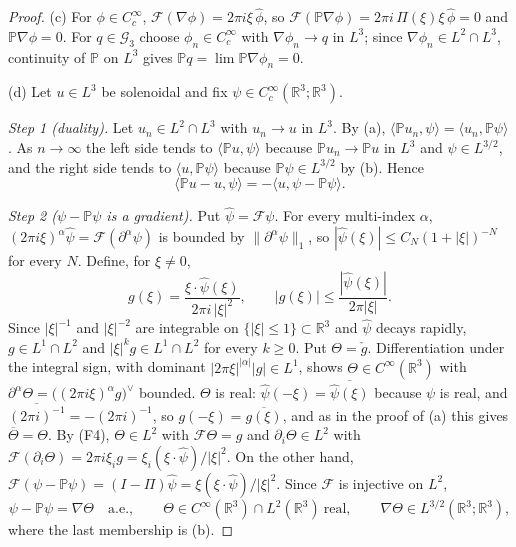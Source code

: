 \documentclass[11pt]{article}
\theoremstyle{definition}
\theoremstyle{plain}
\newcommand{\R}{\mathbb R}
\newcommand{\norm}[1]{\lVert #1\rVert}
\begin{document}
\begin{proof}
(c) For $\phi\in C_c^\infty$, $\mathcal F(\nabla\phi)=2\pi i\xi\,\hat\phi$,
so $\mathcal F(\mathbb P\nabla\phi)=2\pi i\,\Pi(\xi)\xi\,\hat\phi=0$ and
$\mathbb P\nabla\phi=0$.  For $q\in\mathcal G_3$ choose
$\phi_n\in C_c^\infty$ with $\nabla\phi_n\to q$ in $L^3$; since
$\nabla\phi_n\in L^2\cap L^3$, continuity of $\mathbb P$ on $L^3$ gives
$\mathbb Pq=\lim\mathbb P\nabla\phi_n=0$.

(d) Let $u\in L^3$ be solenoidal and fix $\psi\in C_c^\infty(\R^3;\R^3)$.

\emph{Step 1 (duality).}  Let $u_n\in L^2\cap L^3$ with $u_n\to u$ in
$L^3$.  By (a), $\langle\mathbb Pu_n,\psi\rangle=\langle u_n,\mathbb P\psi\rangle$.
As $n\to\infty$ the left side tends to $\langle\mathbb Pu,\psi\rangle$
because $\mathbb Pu_n\to\mathbb Pu$ in $L^3$ and $\psi\in L^{3/2}$, and
the right side tends to $\langle u,\mathbb P\psi\rangle$ because
$\mathbb P\psi\in L^{3/2}$ by (b).  Hence
\begin{equation}\label{eq:cp-duality}
 \langle\mathbb Pu-u,\psi\rangle=-\langle u,\psi-\mathbb P\psi\rangle .
\end{equation}

\emph{Step 2 ($\psi-\mathbb P\psi$ is a gradient).}  Put
$\hat\psi=\mathcal F\psi$.  For every multi-index $\alpha$,
$(2\pi i\xi)^\alpha\hat\psi=\mathcal F(\partial^\alpha\psi)$ is bounded by
$\norm{\partial^\alpha\psi}_1$, so $|\hat\psi(\xi)|\le C_N(1+|\xi|)^{-N}$
for every $N$.  Define, for $\xi\ne0$,
\[
 g(\xi)=\frac{\xi\cdot\hat\psi(\xi)}{2\pi i\,|\xi|^2},
 \qquad |g(\xi)|\le\frac{|\hat\psi(\xi)|}{2\pi|\xi|} .
\]
Since $|\xi|^{-1}$ and $|\xi|^{-2}$ are integrable on $\{|\xi|\le1\}\subset\R^3$
and $\hat\psi$ decays rapidly, $g\in L^1\cap L^2$ and
$|\xi|^kg\in L^1\cap L^2$ for every $k\ge0$.  Put $\Theta=\check g$.
Differentiation under the integral sign, with dominant
$|2\pi\xi|^{|\alpha|}|g|\in L^1$, shows $\Theta\in C^\infty(\R^3)$ with
$\partial^\alpha\Theta=\bigl((2\pi i\xi)^\alpha g\bigr)^\vee$ bounded.
$\Theta$ is real: $\hat\psi(-\xi)=\overline{\hat\psi(\xi)}$ because $\psi$
is real, and $\overline{(2\pi i)^{-1}}=-(2\pi i)^{-1}$, so
$g(-\xi)=\overline{g(\xi)}$, and as in the proof of (a) this gives
$\overline{\Theta}=\Theta$.  By (F4), $\Theta\in L^2$ with $\mathcal F\Theta=g$
and $\partial_i\Theta\in L^2$ with
$\mathcal F(\partial_i\Theta)=2\pi i\xi_ig=\xi_i(\xi\cdot\hat\psi)/|\xi|^2$.
On the other hand,
$\mathcal F(\psi-\mathbb P\psi)=(I-\Pi)\hat\psi=\xi(\xi\cdot\hat\psi)/|\xi|^2$.
Since $\mathcal F$ is injective on $L^2$,
\begin{equation}\label{eq:cp-gradient-rep}
 \psi-\mathbb P\psi=\nabla\Theta\quad\text{a.e.},
 \qquad \Theta\in C^\infty(\R^3)\cap L^2(\R^3)\ \text{real},
 \qquad \nabla\Theta\in L^{3/2}(\R^3;\R^3),
\end{equation}
where the last membership is (b).


\end{proof}
\end{document}
